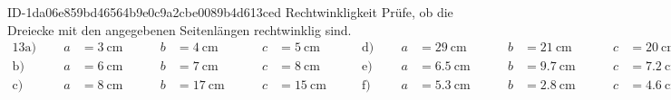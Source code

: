 \begin{exercise}
      {ID-1da06e859bd46564b9e0c9a2cbe0089b4d613ced}
      {Rechtwinkligkeit}
  \ifproblem\problem
    Prüfe, ob die Dreiecke mit den angegebenen
    Seitenlängen rechtwinklig sind.
    \begingroup
      \newcommand{\tri}[4]%
      {%
        \text{#1}\;&\;
        &
        a&=\SI{#2}{\centi\metre}
        &
        \;&\;
        &
        b&=\SI{#3}{\centi\metre}
        &
        \;&\;
        &
        c&=\SI{#4}{\centi\metre}
      }%
      \begin{alignat*}{13}
        \tri{a)}{3}{4}{5}
        \quad&\quad
        \tri{d)}{29}{21}{20}
        \\
        \tri{b)}{6}{7}{8}
        \quad&\quad
        \tri{e)}{6.5}{9.7}{7.2}
        \\
        \tri{c)}{8}{17}{15}
        \quad&\quad
        \tri{f)}{5.3}{2.8}{4.6}
      \end{alignat*}%
    \endgroup
  \fi
\end{exercise}
